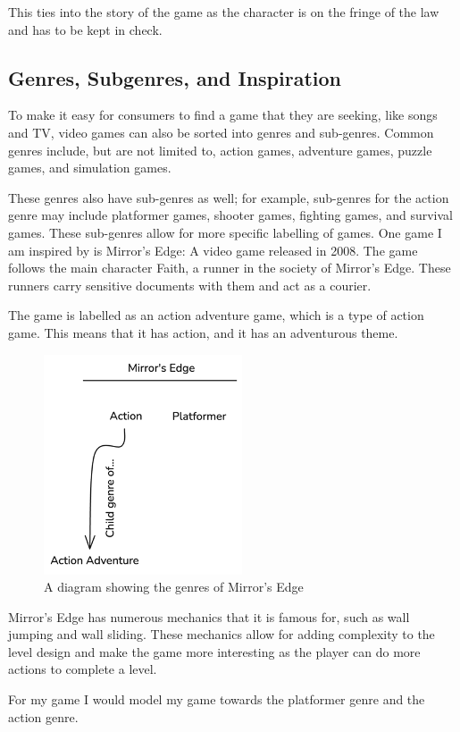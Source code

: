 \documentclass[12pt]{article}
\begin{document}
	This ties into the story of the game as the character is on the fringe of the law and has to be kept in check.
	
	\subsection{Genres, Subgenres, and Inspiration}
	To make it easy for consumers to find a game that they are seeking, like songs and TV, video games can also be sorted into genres and sub-genres. Common genres include, but are not limited to, action games, adventure games, puzzle games, and simulation games.
	
	These genres also have sub-genres as well; for example, sub-genres for the action genre may include platformer games, shooter games, fighting games, and survival games. These sub-genres allow for more specific labelling of games.
	\newpage
	One game I am inspired by is Mirror's Edge: A video game released in 2008. The game follows the main character Faith, a runner in the society of Mirror's Edge. These runners carry sensitive documents with them and act as a courier. \cite{mirrorsEdgeGamespot}
	
	The game is labelled as an action adventure game, which is a type of action game. This means that it has action, and it has an adventurous theme.
	
	\begin{figure}[h]
		\includegraphics{mirrorsEdgeGenres}
		\centering
		\caption{A diagram showing the genres of Mirror's Edge}
	\end{figure}
	
	Mirror's Edge has numerous mechanics that it is famous for, such as wall jumping and wall sliding. These mechanics allow for adding complexity to the level design and make the game more interesting as the player can do more actions to complete a level.
	
	For my game I would model my game towards the platformer genre and the action genre.
	
\end{document}
